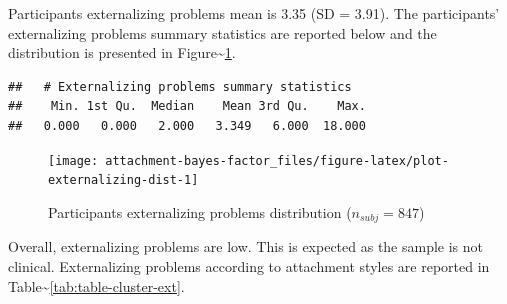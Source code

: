 \documentclass[
]{book}
\begin{document}
Participants externalizing problems mean is 3.35 (SD = 3.91). The participants' externalizing problems summary statistics are reported below and the distribution is presented in Figure\textasciitilde\ref{fig:plot-externalizing-dist}.

\begin{verbatim}
##   # Externalizing problems summary statistics
##    Min. 1st Qu.  Median    Mean 3rd Qu.    Max. 
##   0.000   0.000   2.000   3.349   6.000  18.000
\end{verbatim}

\begin{figure}

{\centering \texttt{[image: attachment-bayes-factor\_files/figure-latex/plot-externalizing-dist-1]} 

}

\caption{Participants externalizing problems distribution ($n_{subj} = 847$)}\label{fig:plot-externalizing-dist}
\end{figure}

Overall, externalizing problems are low. This is expected as the sample is not clinical. Externalizing problems according to attachment styles are reported in Table\textasciitilde\ref{tab:table-cluster-ext}.

\begin{table}[!h]

\caption{\label{tab:table-cluster-ext}Externalizing problems according to attachment styles ($n_{subj} = 847$).}
\centering
{}
\end{table}
\end{document}

